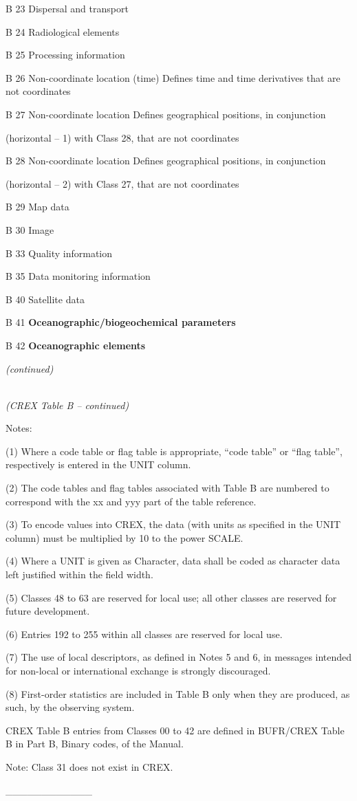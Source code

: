 B 23 Dispersal and transport

B 24 Radiological elements

B 25 Processing information

B 26 Non-coordinate location (time) Defines time and time derivatives that are not coordinates

B 27 Non-coordinate location Defines geographical positions, in conjunction

(horizontal -- 1) with Class 28, that are not coordinates

B 28 Non-coordinate location Defines geographical positions, in conjunction

(horizontal -- 2) with Class 27, that are not coordinates

B 29 Map data

B 30 Image

B 33 Quality information

B 35 Data monitoring information

B 40 Satellite data

B 41 \textbf{Oceanographic/biogeochemical parameters}

B 42 \textbf{Oceanographic elements}

\emph{(continued)}

\emph{\\
(CREX Table B -- continued)}

Notes:

(1) Where a code table or flag table is appropriate, ``code table'' or ``flag table'', respectively is entered in the UNIT column.

(2) The code tables and flag tables associated with Table B are numbered to correspond with the xx and yyy part of the table reference.

(3) To encode values into CREX, the data (with units as specified in the UNIT column) must be multiplied by 10 to the power SCALE.

(4) Where a UNIT is given as Character, data shall be coded as character data left justified within the field width.

(5) Classes 48 to 63 are reserved for local use; all other classes are reserved for future development.

(6) Entries 192 to 255 within all classes are reserved for local use.

(7) The use of local descriptors, as defined in Notes 5 and 6, in messages intended for non-local or international exchange is strongly discouraged.

(8) First-order statistics are included in Table B only when they are produced, as such, by the observing system.

CREX Table B entries from Classes 00 to 42 are defined in BUFR/CREX Table B in Part B, Binary codes, of the Manual.

Note: Class 31 does not exist in CREX.

\_\_\_\_\_\_\_\_\_\_\_\_
